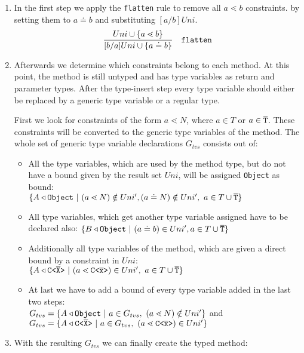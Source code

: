 \documentclass[a4paper,USenglish,cleveref, autoref, thm-restate]{lipics-v2021}
\begin{document}
\begin{enumerate}
\item In the first step we apply the \texttt{flatten} rule to remove all $a \lessdot b$ constraints. by setting them to $a \doteq b$ and substituting $[a/b]Uni$.
\begin{align*}
  \frac{\displaystyle 
    Uni \cup \{  a \lessdot b \}
  }{\displaystyle 
    [b/a]Uni \cup \{  a \doteq b  \}
  }
  \quad \texttt{flatten}
\end{align*}
\item 
Afterwards we determine which constraints belong to each method.
At this point, the method is still untyped and has type variables as return and parameter types.
After the type-insert step every type variable should either be replaced by a generic type variable or a regular type.

First we look for constraints of the form $a \lessdot N$, where $a \in T$ or $a \in \overline{\tt T}$.
These constraints will be converted to the generic type variables of the method.
The whole set of generic type variable declarations $G_{tvs}$ consists out of:
\begin{itemize}
\item All the type variables, which are used by the method type, but do not have a bound given by the result set $Uni$,
will be assigned \texttt{Object} as bound:\\
$\{ A \triangleleft \texttt{Object} \ |\ (a \lessdot N) \notin Uni', (a \doteq N) \notin Uni',\ a \in T \cup \overline{\tt T} \}$
\item All type variables, which get another type variable assigned have to be declared also:
$\{ B \triangleleft \texttt{Object} \ |\ (a \doteq b) \in Uni', a \in T \cup \overline{\tt T} \}$
\item Additionally all type variables of the method, which are given a direct bound by a constraint in $Uni$: \\
$\set{A \triangleleft \exptype{C}{\ol{X}} \ |\ (a \lessdot \exptype{C}{\ol{x}}) \in Uni',\ a \in T \cup \ol{T}}$
\item At last we have to add a bound of every type variable added in the last two steps:\\
$G_{tvs} = \{ A \triangleleft \texttt{Object} \ |\ a \in G_{tvs},\ (a \lessdot N) \notin Uni' \}$ and \\
$G_{tvs} = \{ A \triangleleft \mathtt{C \texttt{<} \overline{\tt X} \texttt{>} }  \ |\ a \in G_{tvs},\ (a \lessdot \mathtt{C \texttt{<} \overline{\tt x} \texttt{>} } ) \in Uni' \}$
\end{itemize}
\item With the resulting $G_{tvs}$ we can finally create the typed method:

\end{enumerate}
\end{document}
